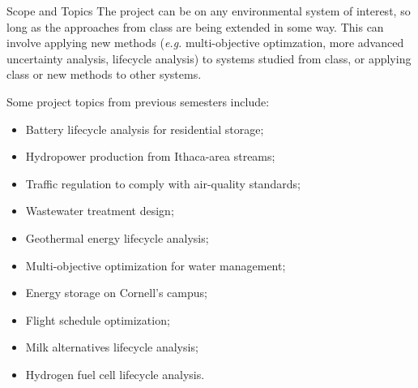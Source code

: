 \documentclass[
  ignorenonframetext,
  aspectratio=169,
]{beamer}
\providecommand{\tightlist}{%
  \setlength{\itemsep}{0pt}\setlength{\parskip}{0pt}}
\begin{document}
\begin{frame}{Scope and Topics}
\protect{}\label{scope-and-topics}
The project can be on any environmental system of interest, so long as
the approaches from class are being extended in some way. This can
involve applying new methods (\emph{e.g.} multi-objective optimzation,
more advanced uncertainty analysis, lifecycle analysis) to systems
studied from class, or applying class or new methods to other systems.

Some project topics from previous semesters include:

\begin{itemize}
\tightlist
\item
  Battery lifecycle analysis for residential storage;
\item
  Hydropower production from Ithaca-area streams;
\item
  Traffic regulation to comply with air-quality standards;
\item
  Wastewater treatment design;
\item
  Geothermal energy lifecycle analysis;
\item
  Multi-objective optimization for water management;
\item
  Energy storage on Cornell's campus;
\item
  Flight schedule optimization;
\item
  Milk alternatives lifecycle analysis;
\item
  Hydrogen fuel cell lifecycle analysis.
\end{itemize}
\end{frame}
\end{document}
